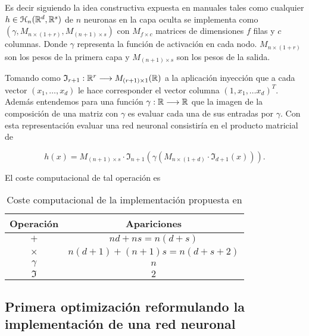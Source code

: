 Es decir siguiendo la idea constructiva expuesta en manuales tales como \cite{learning-from-data-1-2}
 cualquier $h \in \mathcal{H}_n(\mathbb{R}^d,\mathbb{R}^s)$ de $n$ neuronas en la capa oculta se implementa como 
$(\gamma, M_{n \times (1+r)}, M_{(n+1) \times s})$ con $M_{f \times c}$ matrices de dimensiones $f$ filas y $c$ columnas. 
Donde $\gamma$ representa la función de activación en cada nodo. 
$M_{n \times (1+r)}$ son los pesos de la primera capa 
y $M_{(n+1) \times s}$ son los pesos de la salida. 

Tomando como $\mathfrak{I}_{r+1}: \mathbb{R}^r \longrightarrow M_{(r+1) \times 1}(\mathbb{R})$ a la aplicación inyección que a cada vector $(x_1, \ldots, x_d)$ le hace corresponder el vector columna $(1, x_1, \ldots x_d)^T.$
Además entendemos para una función $\gamma : \mathbb{R} \longrightarrow \mathbb{R}$ 
que la imagen de la composición de una matriz con $\gamma$ es evaluar cada una de sus entradas por $\gamma$. 
Con esta representación evaluar una red neuronal consistiría en el producto matricial de 

\begin{equation}
    h(x) =  M_{(n+1) \times s} \cdot
    \mathfrak{I}_{n+1}\left(
         \gamma \left( 
             M_{n \times (1+d)} 
            \cdot 
            \mathfrak{I}_{d+1}(x)
        \right)
    \right).
\end{equation}

El coste computacional de tal operación es 
\begin{table}[h]
    \begin{center}
    \begin{tabular}{| c | c |}
    \hline
    Operación & Apariciones  \\ \hline
    $+$ & $n d+n s = n(d+s)$  \\
    $\times$ & $n(d+1)+(n+1)s = n(d+s+2)$  \\
    $\gamma$ & $n$  \\
    $\mathfrak{I}$ & $2$  \\
    \hline
    \end{tabular}
    \caption{Coste computacional de la implementación propuesta en \cite{MostafaLearningFromData}}
    \label{tab:coste computacional de la implementación de Mustafa}
    \end{center}
\end{table}

\subsection*{Primera optimización reformulando la implementación de una red neuronal}

